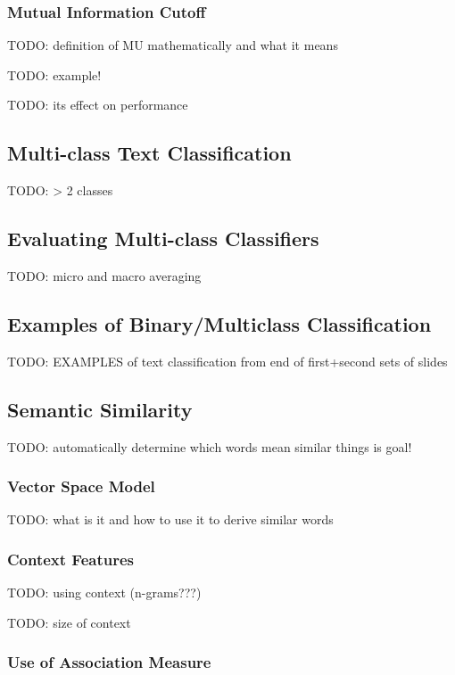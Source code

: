\documentclass{article}
\begin{document}
\subsubsection{Mutual Information Cutoff}

TODO: definition of MU mathematically and what it means

TODO: example!

TODO: its effect on performance

\subsection{Multi-class Text Classification}

TODO: > 2 classes

\subsection{Evaluating Multi-class Classifiers}

TODO: micro and macro averaging

\subsection{Examples of Binary/Multiclass Classification}

TODO: EXAMPLES of text classification from end of first+second sets of slides

\subsection{Semantic Similarity}

TODO: automatically determine which words mean similar things is goal!

\subsubsection{Vector Space Model}

TODO: what is it and how to use it to derive similar words

\subsubsection{Context Features}

TODO: using context (n-grams???)

TODO: size of context

\subsubsection{Use of Association Measure}
\end{document}
